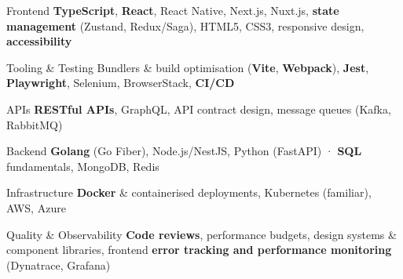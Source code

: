 
\begin{cvskills}

  \cvskill
  {Frontend}
  {\textbf{TypeScript}, \textbf{React}, React Native, Next.js, Nuxt.js, \textbf{state management} (Zustand, Redux/Saga), HTML5, CSS3, responsive design, \textbf{accessibility}}

  \cvskill
  {Tooling \& Testing}
  {Bundlers \& build optimisation (\textbf{Vite}, \textbf{Webpack}), \textbf{Jest}, \textbf{Playwright}, Selenium, BrowserStack, \textbf{CI/CD}}

  \cvskill
  {APIs}
  {\textbf{RESTful APIs}, GraphQL, API contract design, message queues (Kafka, RabbitMQ)}

  \cvskill
  {Backend}
  {\textbf{Golang} (Go Fiber), Node.js/NestJS, Python (FastAPI) · \textbf{SQL} fundamentals, MongoDB, Redis}

  \cvskill
  {Infrastructure}
  {\textbf{Docker} \& containerised deployments, Kubernetes (familiar), AWS, Azure}

  \cvskill
  {Quality \& Observability}
  {\textbf{Code reviews}, performance budgets, design systems \& component libraries, frontend \textbf{error tracking and performance monitoring} (Dynatrace, Grafana)}

\end{cvskills}
